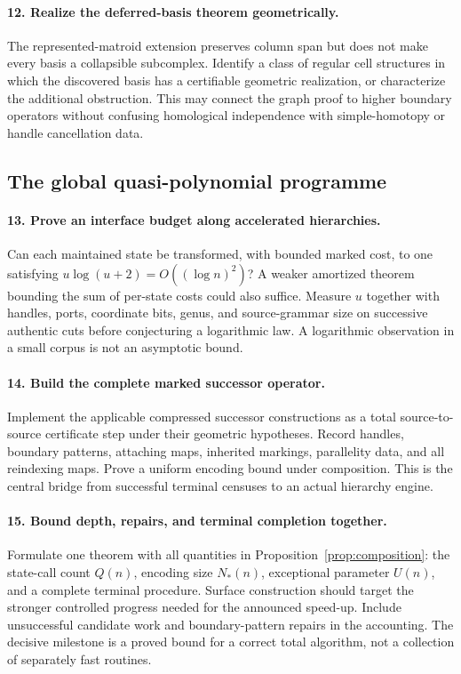 \paragraph{12. Realize the deferred-basis theorem geometrically.}
The represented-matroid extension preserves column span but does not
make every basis a collapsible subcomplex.  Identify a class of regular
cell structures in which the discovered basis has a certifiable
geometric realization, or characterize the additional obstruction.
This may connect the graph proof to higher boundary operators without
confusing homological independence with simple-homotopy or handle
cancellation data.

\subsection{The global quasi-polynomial programme}

\paragraph{13. Prove an interface budget along accelerated hierarchies.}
Can each maintained state be transformed, with bounded marked cost, to
one satisfying $u\log(u+2)=O((\log n)^2)$?  A weaker amortized theorem
bounding the sum of per-state costs could also suffice.  Measure $u$
together with handles, ports, coordinate bits, genus, and source-grammar
size on successive authentic cuts before conjecturing a logarithmic
law.  A logarithmic observation in a small corpus is not an asymptotic
bound.

\paragraph{14. Build the complete marked successor operator.}
Implement the applicable compressed successor constructions as a total
source-to-source certificate step under their geometric hypotheses.
Record handles, boundary patterns, attaching maps, inherited markings,
parallelity data, and all reindexing maps.  Prove a uniform encoding
bound under composition.  This is the central bridge from successful
terminal censuses to an actual hierarchy engine.

\paragraph{15. Bound depth, repairs, and terminal completion together.}
Formulate one theorem with all quantities in
Proposition~\ref{prop:composition}: the state-call count $Q(n)$, encoding
size $N_*(n)$, exceptional parameter $U(n)$, and a complete terminal
procedure.  Surface construction should target the stronger controlled
progress needed for the announced speed-up.  Include unsuccessful
candidate work and boundary-pattern repairs in the accounting.  The
decisive milestone is a proved bound for a correct total algorithm,
not a collection of separately fast routines.

